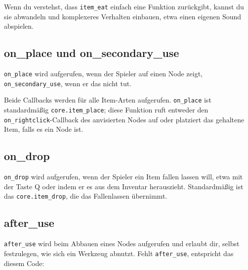 Wenn du verstehst, dass \texttt{item\_\allowbreak{}eat} einfach eine
Funktion zurückgibt, kannst du sie abwandeln und komplexeres Verhalten
einbauen, etwa einen eigenen Sound abspielen.

\subsection{on\_place und
on\_secondary\_use}\label{on_place-und-on_secondary_use}

\texttt{on\_\allowbreak{}place}
wird aufgerufen, wenn der Spieler auf einen Node zeigt,
\texttt{on\_\allowbreak{}secondary\_\allowbreak{}use},
wenn er das nicht tut.

Beide Callbacks werden für alle Item-Arten aufgerufen.
\texttt{on\_\allowbreak{}place} ist standardmäßig
\texttt{core.\allowbreak{}item\_\allowbreak{}place};
diese Funktion ruft entweder den
\texttt{on\_\allowbreak{}rightclick}-Callback
des anvisierten Nodes auf oder platziert das gehaltene Item, falls es
ein Node ist.

\subsection{on\_drop}\label{on_drop}

\texttt{on\_\allowbreak{}drop}
wird aufgerufen, wenn der Spieler ein Item fallen lassen will, etwa mit
der Taste Q oder indem er es aus dem Inventar herauszieht. Standardmäßig
ist das
\texttt{core.\allowbreak{}item\_\allowbreak{}drop},
die das Fallenlassen übernimmt.

\subsection{after\_use}\label{after_use}

\texttt{after\_\allowbreak{}use}
wird beim Abbauen eines Nodes aufgerufen und erlaubt dir, selbst
festzulegen, wie sich ein Werkzeug abnutzt. Fehlt
\texttt{after\_\allowbreak{}use}, entspricht das diesem Code:

